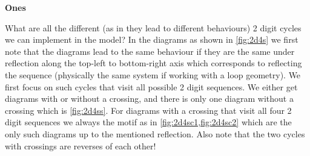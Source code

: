 \documentclass[11pt]{article}
\begin{document}
\begin{center}
    \LARGE
    \textbf{Ones}
    \vspace{1em}
\end{center}

What are all the different (as in they lead to different behaviours) 2 digit cycles we can implement in the model?
In the diagrams as shown in \cref{fig:2d4s} we first note that the diagrams lead to the same behaviour if they are the same under reflection along the top-left to bottom-right axis which corresponds to reflecting the sequence (physically the same system if working with a loop geometry).
We first focus on such cycles that visit all possible 2 digit sequences.
We either get diagrams with or without a crossing, and there is only one diagram without a crossing which is \cref{fig:2d4ss}.
For diagrams with a crossing that visit all four 2 digit sequences we always the motif as in \cref{fig:2d4sc1,fig:2d4sc2} which are the only such diagrams up to the mentioned reflection.
Also note that the two cycles with crossings are reverses of each other!
\end{document}
